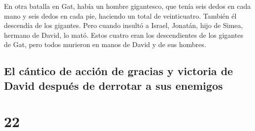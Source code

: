  En otra batalla en Gat, había un hombre gigantesco, que
tenía seis dedos en cada mano y seis dedos en cada pie, haciendo un
total de veinticuatro. También él descendía de los gigantes.
 Pero cuando insultó a Israel, Jonatán, hijo de Simea,
hermano de David, lo mató.  Estos cuatro eran los
descendientes de los gigantes de Gat, pero todos murieron en manos de
David y de sus hombres.

\hypertarget{el-cuxe1ntico-de-acciuxf3n-de-gracias-y-victoria-de-david-despuuxe9s-de-derrotar-a-sus-enemigos}{%
\subsection{El cántico de acción de gracias y victoria de David después
de derrotar a sus
enemigos}\label{el-cuxe1ntico-de-acciuxf3n-de-gracias-y-victoria-de-david-despuuxe9s-de-derrotar-a-sus-enemigos}}

\hypertarget{section-21}{%
\section{22}\label{section-21}}

